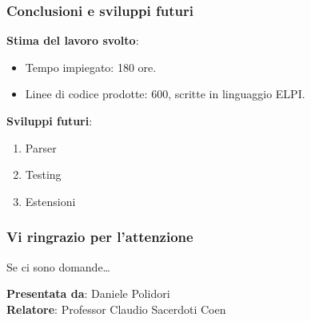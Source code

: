 \documentclass{beamer}
\begin{document}
\begin{frame}

 \frametitle{Conclusioni e sviluppi futuri}

 \textbf{Stima del lavoro svolto}:
 \begin{itemize}
  \item Tempo impiegato: 180 ore.
  \item Linee di codice prodotte: 600, scritte in linguaggio ELPI.
 \end{itemize}

 \vfill

 \textbf{Sviluppi futuri}:
 \begin{enumerate}
  \item Parser
  \item Testing
  \item Estensioni
 \end{enumerate}

\end{frame}


\begin{frame}

 \frametitle{Vi ringrazio per l'attenzione}

 Se ci sono domande\ldots

 \vfill

 \begin{flushright}
  \textbf{Presentata da}: Daniele Polidori\\
  \textbf{Relatore}: Professor Claudio Sacerdoti Coen
 \end{flushright}

\end{frame}


\begin{frame}

 \frametitle{}


\end{frame}
\end{document}
